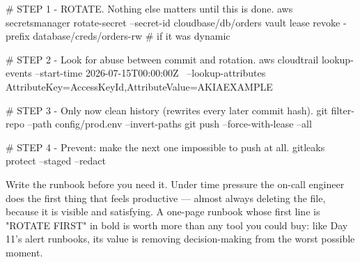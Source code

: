 \begin{bashbox}
# STEP 1 - ROTATE. Nothing else matters until this is done.
aws secretsmanager rotate-secret --secret-id cloudbase/db/orders
vault lease revoke -prefix database/creds/orders-rw   # if it was dynamic

# STEP 2 - Look for abuse between commit and rotation.
aws cloudtrail lookup-events --start-time 2026-07-15T00:00:00Z \
  --lookup-attributes AttributeKey=AccessKeyId,AttributeValue=AKIAEXAMPLE

# STEP 3 - Only now clean history (rewrites every later commit hash).
git filter-repo --path config/prod.env --invert-paths
git push --force-with-lease --all

# STEP 4 - Prevent: make the next one impossible to push at all.
gitleaks protect --staged --redact
\end{bashbox}

\begin{opsnote}
Write the runbook before you need it. Under time pressure the on-call engineer does the first thing that feels productive --- almost always deleting the file, because it is visible and satisfying. A one-page runbook whose first line is "ROTATE FIRST" in bold is worth more than any tool you could buy: like Day 11's alert runbooks, its value is removing decision-making from the worst possible moment.
\end{opsnote}

